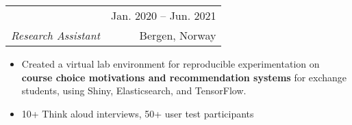 \documentclass[letterpaper,11pt]{article}
\makeatletter
\newcommand{\myuline}[1]{%
  \uline{\phantom{#1}}%
  \llap{\contour{white}{#1}}%
}
\newcommand{\MYhref}[2]{
\myuline{\href{#1}{{#2}}}
}%
\newcommand{\resumeItem}[1]{
  \item\small{
    {#1 \vspace{-1pt}}
  }
}
\newcommand{\resumeSubheading}[4]{
  \vspace{-10pt}\item
    \begin{tabular*}{\textwidth}[t]{l@{\extracolsep{\fill}}r}
      \textbf{#1} & {\color{dark-grey}\small #2}\vspace{1pt}\\ %
      \hspace{2pt}\textit{#3} & {\color{dark-grey} \small #4}\\ %
    \end{tabular*}\vspace{-4pt}
}
\newcommand{\resumeItemListStart}{\begin{itemize}[label={-}]}
\newcommand{\resumeItemListEnd}{\end{itemize}\vspace{0pt}}
\makeatother
\begin{document}
      

      
    \resumeSubheading
      {\MYhref{https://slate.uib.no}{Centre For The Science Of Learning \& Technology, University of Bergen}}{Jan. 2020 -- Jun. 2021}
      {Research Assistant}{Bergen, Norway}
      \resumeItemListStart
        \resumeItem{Created a virtual lab environment for reproducible experimentation on \textbf{course choice motivations and recommendation systems} for exchange students, using Shiny, Elasticsearch, and TensorFlow.}
        \resumeItem{10+ Think aloud interviews, 50+ user test participants}
    \resumeItemListEnd




\end{document}
